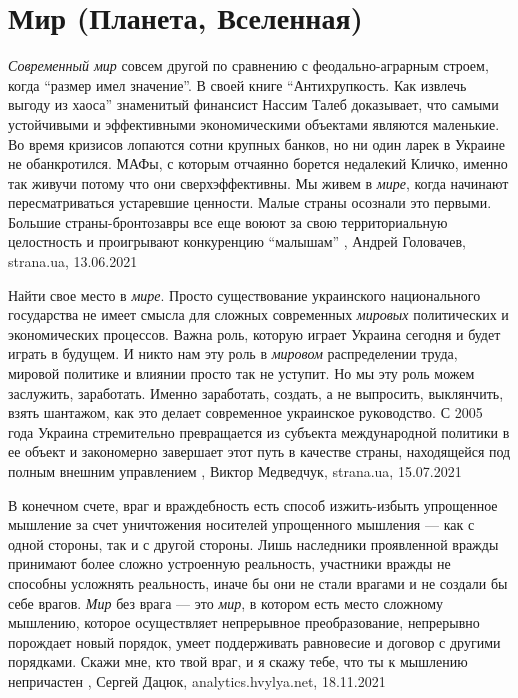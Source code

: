  
 
 
 
 
\chapter{Мир (Планета, Вселенная)}
\label{sec:slova.mir.world}

\emph{Современный мир} совсем другой по сравнению с феодально-аграрным строем, когда
\enquote{размер имел значение}. В своей книге \enquote{Антихрупкость. Как
извлечь выгоду из хаоса} знаменитый финансист Нассим Талеб доказывает, что
самыми устойчивыми и эффективными экономическими объектами являются маленькие.
Во время кризисов лопаются сотни крупных банков, но ни один ларек в Украине не
обанкротился.  МАФы, с которым отчаянно борется недалекий Кличко, именно так
живучи потому что они сверхэффективны.  Мы живем в \emph{мире}, когда начинают
пересматриваться устаревшие ценности. Малые страны осознали это первыми.
Большие страны-бронтозавры все еще воюют за свою территориальную целостность и
проигрывают конкуренцию \enquote{малышам}
, 
Андрей Головачев, strana.ua, 13.06.2021

Найти свое место в \emph{мире}.  Просто существование украинского национального
государства не имеет смысла для сложных современных \emph{мировых} политических и
экономических процессов. Важна роль, которую играет Украина сегодня и будет
играть в будущем. И никто нам эту роль в \emph{мировом} распределении труда, мировой
политике и влиянии просто так не уступит. Но мы эту роль можем заслужить,
заработать. Именно заработать, создать, а не выпросить, выклянчить, взять
шантажом, как это делает современное украинское руководство. С 2005 года
Украина стремительно превращается из субъекта международной политики в ее
объект и закономерно завершает этот путь в качестве страны, находящейся под
полным внешним управлением
, 
Виктор Медведчук, strana.ua, 15.07.2021

В конечном счете, враг и враждебность есть способ изжить-избыть упрощенное
мышление за счет уничтожения носителей упрощенного мышления — как с одной
стороны, так и с другой стороны. Лишь наследники проявленной вражды принимают
более сложно устроенную реальность, участники вражды не способны усложнять
реальность, иначе бы они не стали врагами и не создали бы себе врагов.  \emph{Мир} без
врага — это \emph{мир}, в котором есть место сложному мышлению, которое осуществляет
непрерывное преобразование, непрерывно порождает новый порядок, умеет
поддерживать равновесие и договор с другими порядками.  Скажи мне, кто твой
враг, и я скажу тебе, что ты к мышлению непричастен
, Сергей Дацюк, analytics.hvylya.net, 18.11.2021
